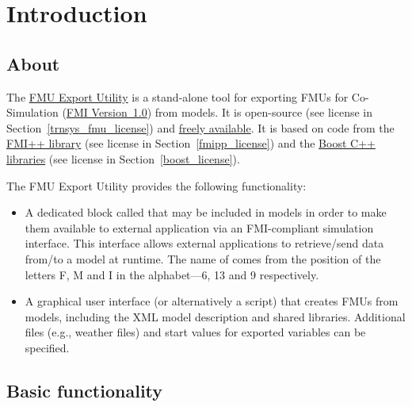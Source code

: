 \chapter{Introduction}


\section{About}

The \href{http://trnsys-fmu.sourceforge.net}{\fmipp \trnsys FMU Export Utility} is a stand-alone tool for exporting FMUs for Co-Simulation (\href{https://www.fmi-standard.org/}{FMI Version~1.0}) from \href{http://www.trnsys.com/}{\trnsys} models. It is open-source (see license in Section~\ref{trnsys_fmu_license}) and \href{http://trnsys-fmu.sourceforge.net}{freely available}. It is based on code from the \href{http://fmipp.sourceforge.net}{FMI++ library} (see license in Section~\ref{fmipp_license}) and the \href{http://www.boost.org/}{Boost C++ libraries} (see license in Section~\ref{boost_license}).

The \fmipp \trnsys FMU Export Utility provides the following functionality:
\begin{itemize}
  \item A dedicated \trnsys block called \type that may be included in \trnsys models in order to make them available to external application via an FMI-compliant simulation interface. This interface allows external applications to retrieve/send data from/to a \trnsys model at runtime. The name of \type comes from the position of the letters F, M and I in the alphabet---6, 13 and 9 respectively.
  \item A graphical user interface (or alternatively a \href{https://www.python.org/}{\python} script) that creates FMUs from \trnsys models, including the XML model description and shared libraries. Additional files (e.g., weather files) and start values for exported variables can be specified.
\end{itemize}

\section{Basic functionality}

